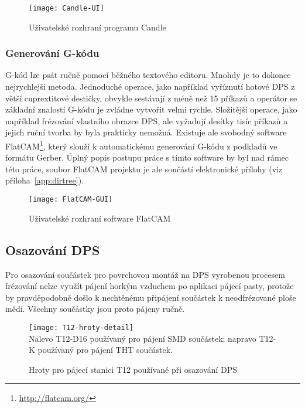 \begin{figure}[htbp]
    \centering
    \texttt{[image: Candle-UI]}
    \caption{Uživatelské rozhraní programu Candle}
    \label{fig:CNC Candle}
\end{figure}


\subsubsection{Generování G-kódu}
G-kód lze psát ručně pomocí běžného textového editoru. Mnohdy je to dokonce
nejrychlejší metoda. Jednoduché operace, jako například vyříznutí hotové DPS
z větší cuprextitové destičky, obvykle sestávají z méně než 15 příkazů
a operátor se základní znalostí G-kódu je zvládne vytvořit velmi rychle.
Složitější operace, jako například frézování vlastního obrazce DPS, ale
vyžadují desítky tisíc příkazů a jejich ruční tvorba by byla prakticky nemožná.
Existuje ale svobodný software FlatCAM\footnote{\url{http://flatcam.org/}},
který slouží k automatickému generování G-kódu z podkladů ve formátu Gerber.
Úplný popis postupu práce s tímto software by byl nad rámec této práce, soubor
FlatCAM projektu je ale součástí elektronické přílohy (viz
příloha~\vref{app:dirtree}).

\begin{figure}[htbp]
    \centering
    \texttt{[image: FlatCAM-GUI]}
    \caption{Uživatelské rozhraní software FlatCAM}
    \label{fig:CNC FlatCAM}
\end{figure}


\subsection{Osazování DPS}
Pro osazování součástek pro povrchovou montáž na DPS vyrobenou procesem
frézování nelze využít pájení horkým vzduchem po aplikaci pájecí pasty, protože
by pravděpodobně došlo k nechtěnému připájení součástek k neodfrézované ploše
mědi. Všechny součástky jsou proto pájeny ručně.

\begin{figure}[htb]
    \centering
    \texttt{[image: T12-hroty-detail]}
    \\
    {\footnotesize Nalevo T12-D16 používaný pro pájení SMD součástek;
    napravo T12-K používaný pro pájení THT součástek.}
    \caption{Hroty pro pájecí stanici T12 používané při osazování DPS}
    \label{fig:PCB pajecka hroty}
\end{figure}

